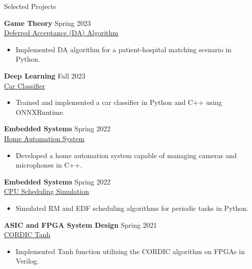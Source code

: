 \documentclass{resume} %
\begin{document}
\begin{rSection}{Selected Projects}
\vspace{-1.25em}
\item \textbf{Game Theory} \hfill {Spring 2023} \\
\href{https://github.com/NimaSamadi007/GameTheoryProject}{Deferred Acceptance (DA) Algorithm}
\vspace{-5pt}
\begin{itemize}
    \itemsep -3pt {} 
        \item Implemented DA algorithm for a patient-hospital matching scenario in Python.  
\end{itemize}
\item \textbf{Deep Learning} \hfill {Fall 2023} \\
\href{https://github.com/NimaSamadi007/CarClassifier}{Car Classifier}
\vspace{-5pt}
\begin{itemize}
    \itemsep -3pt {} 
        \item Trained and implemented a car classifier in Python and C++ using ONNXRuntime.
\end{itemize}
\item \textbf{Embedded Systems} \hfill {Spring 2022} \\
\href{https://github.com/NimaSamadi007/EmbProject}{Home Automation System}
\vspace{-5pt}
\begin{itemize}
    \itemsep -3pt {} 
        \item Developed a home automation system capable of managing cameras and microphones in C++.
\end{itemize}
\item \textbf{Embedded Systems} \hfill {Spring 2022} \\
\href{https://github.com/NimaSamadi007/CPUScheduling}{CPU Scheduling Simulation}
\vspace{-5pt}
\begin{itemize}
    \itemsep -3pt {} 
        \item Simulated RM and EDF scheduling algorithms for periodic tasks in Python.
\end{itemize}
\item \textbf{ASIC and FPGA System Design} \hfill {Spring 2021} \\
\href{https://github.com/NimaSamadi007/cordic_tanh}{CORDIC Tanh}
\vspace{-5pt}
\begin{itemize}
    \itemsep -3pt {} 
        \item Implemented Tanh function utilizing the CORDIC algorithm on FPGAs in Verilog.
\end{itemize}
\end{rSection} 
\end{document}
